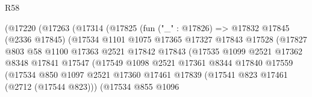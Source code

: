 \begin{lexlean}{R58}
\begin{coremodule}
                                (@17220
                                  (@17263
                                    (@17314
                                      (@17825
                                        (fun ("_" : @17826) =>
                                        @17832
                                          @17845
                                          (@2336 @17845)
                                          (@17534
                                            @1101
                                            @1075
                                            @17365
                                            @17327
                                            @17843
                                            @17528
                                            (@17827
                                              @803
                                              @58
                                              @1100
                                              @17363
                                              @2521
                                              @17842
                                              @17843
                                              (@17535
                                                @1099
                                                @2521
                                                @17362
                                                @8348
                                                @17841
                                                @17547
                                                (@17549
                                                  @1098
                                                  @2521
                                                  @17361
                                                  @8344
                                                  @17840
                                                  @17559
                                                  (@17534
                                                    @850
                                                    @1097
                                                    @2521
                                                    @17360
                                                    @17461
                                                    @17839
                                                    (@17541 @823 @17461 (@2712 (@17544 @823)))
                                                    (@17534
                                                      @855
                                                      @1096

\end{coremodule}
\end{lexlean}
